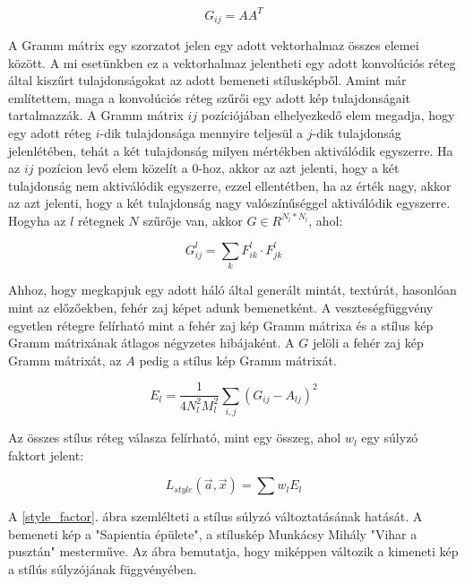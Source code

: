 \documentclass[12pt, a4paper, oneside]{book}
\theoremstyle{tetel}
\begin{document}
\begin{equation}
G_{ij} = A A^T
\end{equation}

A Gramm mátrix egy szorzatot jelen egy adott vektorhalmaz összes elemei között. A mi esetünkben ez a vektorhalmaz jelentheti egy adott konvolúciós réteg által kiszűrt tulajdonságokat az adott bemeneti stílusképből. Amint már említettem, maga a konvolúciós réteg szűrői egy adott kép tulajdonságait tartalmazzák. A Gramm mátrix \(ij\) pozíciójában elhelyezkedő elem megadja, hogy egy adott réteg \(i\)-dik tulajdonsága mennyire teljesül a \(j\)-dik tulajdonság jelenlétében, tehát a két tulajdonság milyen mértékben aktiválódik egyszerre. Ha az \(ij\) pozícion levő elem közelít a \(0\)-hoz, akkor az azt jelenti, hogy a két tulajdonság nem aktiválódik egyszerre, ezzel ellentétben, ha az érték nagy, akkor az azt jelenti, hogy a két tulajdonság nagy valószínűséggel aktiválódik egyszerre.
\newline
\indent
Hogyha az \(l\) rétegnek \(N\) szűrője van, akkor \(G \in R^{N_l*N_l}\), ahol:

\begin{equation}
G^l_{ij} = \sum_{k} F^l_{ik} \cdot F^l_{jk}
\end{equation}

Ahhoz, hogy megkapjuk egy adott háló által generált mintát, textúrát, hasonlóan mint az előzőekben, fehér zaj képet adunk bemenetként. A veszteségfüggvény egyetlen rétegre felírható mint a fehér zaj kép Gramm mátrixa és a stílus kép Gramm mátrixának átlagos négyzetes hibájaként. A \(G\) jelöli a fehér zaj kép Gramm mátrixát, az \(A\) pedig a stílus kép Gramm mátrixát.

\begin{equation}
E_l = \frac{1}{4N^2_l M^2_l} \sum_{i,j} (G_{ij} - A_{lj})^2
\end{equation}

Az összes stílus réteg válasza felírható, mint egy összeg, ahol \(w_l\) egy súlyzó faktort jelent:

\begin{equation}
L_{style}(\vec{a}, \vec{x}) = \sum w_lE_l
\end{equation}

A \ref{style_factor}. ábra szemlélteti a stílus súlyzó változtatásának hatását. A bemeneti kép a "Sapientia épülete", a stíluskép Munkácsy Mihály "Vihar a pusztán" mesterműve. Az ábra bemutatja, hogy miképpen változik a kimeneti kép a stílús súlyzójának függvényében.
\end{document}
